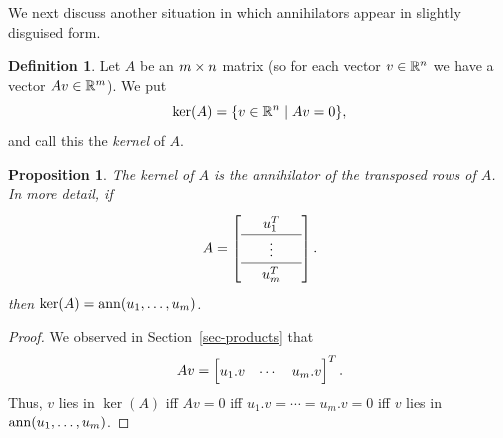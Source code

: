 \documentclass[reqno]{amsart}
\newtheorem{proposition}[theorem]{Proposition}
\theoremstyle{definition}
\newtheorem{definition}[theorem]{Definition}
\begin{document}
We next discuss another situation in which annihilators appear in
slightly disguised form.
\begin{definition}\label{defn-ker}
 Let $A$ be an $m\times n$ matrix (so for each vector $v\in{\mathbb{R}}^n$ we have
 a vector $Av\in{\mathbb{R}}^m$).  We put 
 \[ \ker(A) = \{v\in{\mathbb{R}}^n \;|\; Av=0\}, \]
 and call this the \emph{kernel} of $A$.
\end{definition}

\begin{proposition}\label{prop-ker-ann}
 The kernel of $A$ is the annihilator of the transposed rows of $A$.
 In more detail, if 
 \[ \renewcommand{\arraystretch}{1.3} 
   A = \left[\begin{array}{ccc}
        & u_1^T & \\ \hline
        & \vdots & \\ \hline
        & u_m^T &
       \end{array}\right].
 \]
 then $\ker(A)=\operatorname{ann}(u_1,\dotsc,u_m)$.
\end{proposition}
\begin{proof}
 We observed in Section~\ref{sec-products} that 
 \[ Av = \bbm u_1.v & \dotsb & u_m.v \ebm^T. \]
 Thus, $v$ lies in $\ker(A)$ iff $Av=0$ iff $u_1.v=\dotsb=u_m.v=0$ iff
 $v$ lies in $\operatorname{ann}(u_1,\dotsc,u_m)$.
\end{proof}
\end{document}

